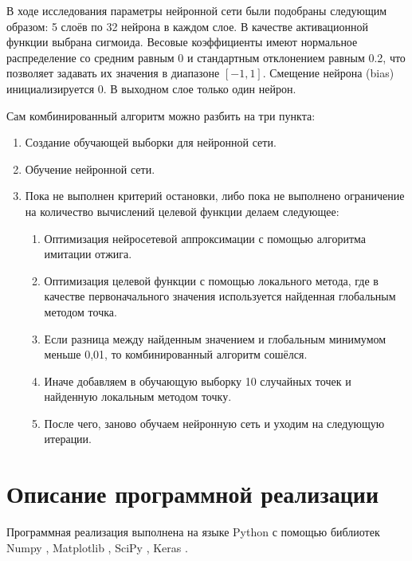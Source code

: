 \documentclass[11pt, oneside, a4paper]{article}
\begin{document}
В ходе исследования параметры нейронной сети были подобраны следующим образом: 5 слоёв по 32 нейрона в каждом слое. В качестве активационной функции выбрана сигмоида. Весовые коэффициенты имеют нормальное распределение со средним равным 0 и стандартным отклонением равным 0.2, что позволяет задавать их значения в диапазоне $[-1,1]$. Смещение нейрона (bias) инициализируется 0. В выходном слое только один нейрон. 

Сам комбинированный алгоритм можно разбить на три пункта:
\begin{enumerate}
\item Создание обучающей выборки для нейронной сети.
\item Обучение нейронной сети.
\item Пока не выполнен критерий остановки, либо пока не выполнено ограничение на количество вычислений целевой функции делаем следующее:
\begin{enumerate}
\item Оптимизация нейросетевой аппроксимации с помощью алгоритма имитации отжига.
\item Оптимизация целевой функции с помощью локального метода, где в качестве первоначального значения используется найденная глобальным методом точка.
\item Если разница между найденным значением и глобальным минимумом меньше 0,01, то комбинированный алгоритм сошёлся.
\item Иначе добавляем в обучающую выборку 10 случайных точек и найденную локальным методом точку.
\item После чего, заново обучаем нейронную сеть и уходим на следующую итерации.
\end{enumerate}
\end{enumerate}
\section{Описание программной реализации}
Программная реализация выполнена на языке Python с помощью библиотек Numpy \cite{fio_bib12}, Matplotlib \cite{fio_bib13}, SciPy \cite{fio_bib14}, Keras \cite{fio_bib15}. 	
\end{document}
